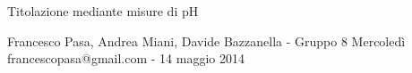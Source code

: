 \documentclass[11pt, twoside, a4paper]{article}
\begin{document}
\begin{center}

        {\huge Titolazione mediante misure di pH}
    \vspace{0.1cm}

      	{Francesco Pasa, Andrea Miani, Davide Bazzanella - Gruppo 8 Mercoledì} \\
      	{francescopasa@gmail.com - 14 maggio 2014}
    \vspace{-0.2cm}

\end{center}





\end{document}
